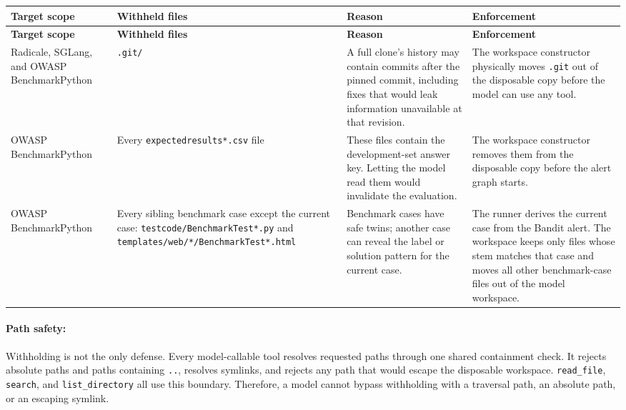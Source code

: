 \documentclass[11pt]{article}
\begin{document}
{\small
\renewcommand{\arraystretch}{1.25}
\setlength{\tabcolsep}{2pt}
\begin{longtable}{@{}>{\raggedright\arraybackslash}p{} >{\raggedright\arraybackslash}p{} >{\raggedright\arraybackslash}p{} >{\raggedright\arraybackslash}p{}@{}}
\toprule
\textbf{Target scope} & \textbf{Withheld files} & \textbf{Reason} & \textbf{Enforcement} \\
\midrule
\endfirsthead
\toprule
\textbf{Target scope} & \textbf{Withheld files} & \textbf{Reason} & \textbf{Enforcement} \\
\midrule
\endhead
Radicale, SGLang, and OWASP BenchmarkPython & \texttt{.git/} & A full clone's history may contain commits after the pinned commit, including fixes that would leak information unavailable at that revision. & The workspace constructor physically moves \texttt{.git} out of the disposable copy before the model can use any tool. \\ \midrule
OWASP BenchmarkPython & Every \texttt{expectedresults*}\newline\texttt{.csv} file & These files contain the development-set answer key. Letting the model read them would invalidate the evaluation. & The workspace constructor removes them from the disposable copy before the alert graph starts. \\ \midrule
OWASP BenchmarkPython & Every sibling benchmark case except the current case: \texttt{testcode/}\newline\texttt{BenchmarkTest*.py} and \texttt{templates/web/*/}\newline\texttt{BenchmarkTest*.}\newline\texttt{html} & Benchmark cases have safe twins; another case can reveal the label or solution pattern for the current case. & The runner derives the current case from the Bandit alert. The workspace keeps only files whose stem matches that case and moves all other benchmark-case files out of the model workspace. \\
\bottomrule
\end{longtable}
}

\paragraph{Path safety:}
Withholding is not the only defense. Every model-callable tool resolves requested paths through one shared containment check. It rejects absolute paths and paths containing \texttt{..}, resolves symlinks, and rejects any path that would escape the disposable workspace. \texttt{read\_file}, \texttt{search}, and \texttt{list\_directory} all use this boundary. Therefore, a model cannot bypass withholding with a traversal path, an absolute path, or an escaping symlink.
\end{document}
